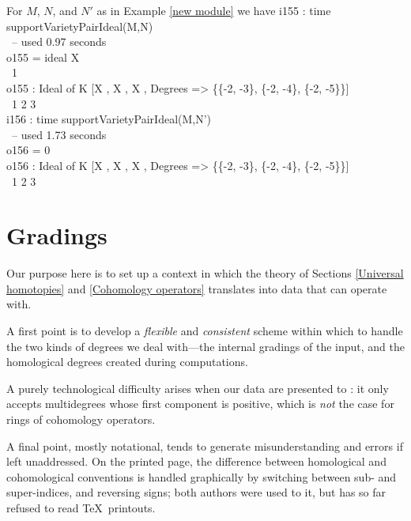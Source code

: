 \begin{sExample}
For $M$, $N$, and $N'$ as in Example \ref{new module} we have
\beginOutput
i155 : time supportVarietyPairIdeal(M,N)\\
\     -- used 0.97 seconds\\
\emptyLine
o155 = ideal X\\
\              1\\
\emptyLine
o155 : Ideal of K [X , X , X , Degrees => \{\{-2, -3\}, \{-2, -4\}, \{-2, -5\}\}]\\
\                    1   2   3\\
\endOutput
\beginOutput
i156 : time supportVarietyPairIdeal(M,N')\\
\     -- used 1.73 seconds\\
\emptyLine
o156 = 0\\
\emptyLine
o156 : Ideal of K [X , X , X , Degrees => \{\{-2, -3\}, \{-2, -4\}, \{-2, -5\}\}]\\
\                    1   2   3\\
\endOutput
\end{sExample}

\appendix

\section{Gradings}
\label{Gradings}

Our purpose here is to set up a context in which the theory of Sections
\ref{Universal homotopies} and \ref{Cohomology operators} translates
into data that \Mtwo can operate with.

A first point is to develop a {\it flexible\/} and {\it consistent\/}
scheme within which to handle the two kinds of degrees we deal
with---the internal gradings of the input, and the homological degrees
created during computations.

A purely technological difficulty arises when our data are presented to
\Mtwo: it only accepts multidegrees whose first component is positive,
which is {\it not\/} the case for rings of cohomology operators.

A final point, mostly notational, tends to generate misunderstanding
and errors if left unaddressed.  On the printed page, the difference
between homological and cohomological conventions is handled
graphically by switching between sub- and super-indices, and reversing
signs; both authors were used to it, but \Mtwo has so far refused to
read \TeX\ printouts.

